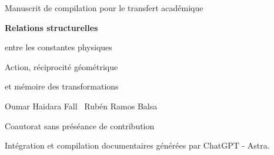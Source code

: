 \thispagestyle{plain}
\begin{center}
{\fontsize{10}{12}\selectfont Manuscrit de compilation pour le transfert académique\par}
\vspace{1.5mm}
{\fontsize{17}{20.5}\selectfont\bfseries Relations structurelles\par entre les constantes physiques\par}
\vspace{1.5mm}
{\fontsize{11}{13.5}\selectfont Action, réciprocité géométrique\par et mémoire des transformations\par}
\vspace{1.5mm}
{\fontsize{11.5}{14}\selectfont Oumar Haidara Fall \textperiodcentered\ Rubén Ramos Balsa\par}
\vspace{1.5mm}
{\fontsize{8}{10}\selectfont Coautorat sans préséance de contribution\par}
\vspace{1.5mm}
{\fontsize{8}{10}\selectfont Intégration et compilation documentaires générées par ChatGPT - Astra.\par}
\end{center}
\vspace{1.5mm}
